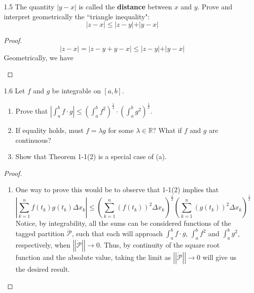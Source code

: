 \begin{enumerate}
    \item[1.5] The quantity \( \vert y -x \vert \) is called the \textbf{distance} between \( x \) and \( y \). Prove and interpret geometrically the ``triangle inequality":
    \[
    \vert z-x \vert \leq \vert z-y \vert + \vert y-x \vert
    \]
    
    \begin{proof}
    \[
    \vert z-x \vert = \vert z-y+y-x \vert \leq \vert z-y \vert + \vert y-x \vert
    \]
    Geometrically, we have
    \begin{center}
    \end{center}
    \end{proof}
    
    \item[1.6] Let \( f \) and \( g \) be integrable on \( [a,b] \).
    \begin{enumerate}
        \item Prove that \( \left| \int_a^b f\cdot g \right| \leq \left( \int_a^b f^2 \right)^{\frac{1}{2}} \cdot \left( \int_a^b g^2 \right)^{\frac{1}{2}}  \).
        \item If equality holds, must \( f = \lambda g \) for some \( \lambda \in \mathbb{R} \)? What if \( f \) and \( g \) are continuous?
        \item Show that Theorem 1-1(2) is a special case of (a).
    \end{enumerate}
    
    \begin{proof}
    \begin{enumerate}
        \item One way to prove this would be to observe that 1-1(2) implies that
        \[
        \left| \sum_{k=1}^n f(t_k)g(t_k)\Delta x_k \right| \leq \left( \sum_{k=1}^n (f(t_k))^2\Delta x_k \right)^{\frac{1}{2}} \left( \sum_{k=1}^n (g(t_k))^2 \Delta x_k \right)^{\frac{1}{2}}
        \]
        Notice, by integrability, all the sums can be considered functions of the tagged partition \( \dot{\mathcal{P}} \), such that each will approach \( \int_a^b f\cdot g \), \( \int_a^b f^2 \) and \( \int_a^b g^2 \), respectively, when \( \left|\left| \dot{\mathcal{P}} \right|\right| \rightarrow 0 \). Thus, by continuity of the square root function and the absolute value, taking the limit as \( \left|\left| \dot{\mathcal{P}} \right|\right| \rightarrow 0 \) will give us the desired result. 
        

\end{enumerate}
\end{proof}
\end{enumerate}

